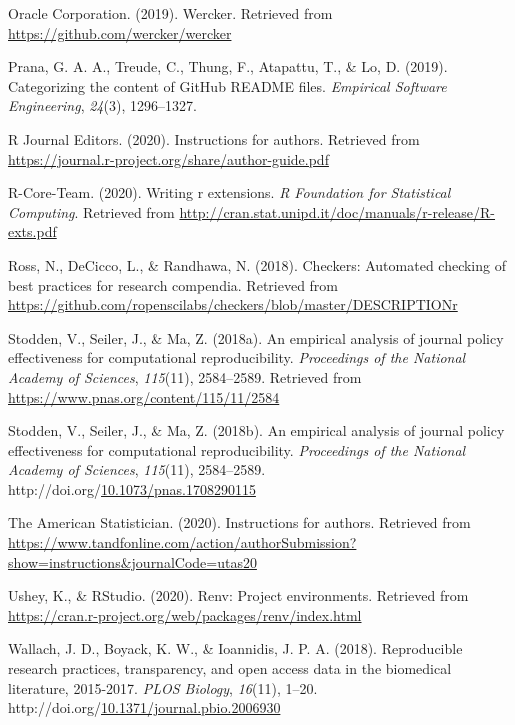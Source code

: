 \documentclass[12pt,twoside]{reedthesis}
\newenvironment{CSLReferences}%
  {}%
  {\par}
\begin{document}
\begin{CSLReferences}{1}{0}
\leavevmode\hypertarget{ref-wercker}{}%
Oracle Corporation. (2019). Wercker. Retrieved from \url{https://github.com/wercker/wercker}

\leavevmode\hypertarget{ref-prana2019categorizing}{}%
Prana, G. A. A., Treude, C., Thung, F., Atapattu, T., \& Lo, D. (2019). Categorizing the content of GitHub README files. \emph{Empirical Software Engineering}, \emph{24}(3), 1296--1327.

\leavevmode\hypertarget{ref-r-journal}{}%
R Journal Editors. (2020). Instructions for authors. Retrieved from \url{https://journal.r-project.org/share/author-guide.pdf}

\leavevmode\hypertarget{ref-coreteam-extensions}{}%
R-Core-Team. (2020). Writing r extensions. \emph{R Foundation for Statistical Computing}. Retrieved from \url{http://cran.stat.unipd.it/doc/manuals/r-release/R-exts.pdf}

\leavevmode\hypertarget{ref-R-checkers}{}%
Ross, N., DeCicco, L., \& Randhawa, N. (2018). Checkers: Automated checking of best practices for research compendia. Retrieved from \url{https://github.com/ropenscilabs/checkers/blob/master/DESCRIPTIONr}

\leavevmode\hypertarget{ref-policy-effectiveness}{}%
Stodden, V., Seiler, J., \& Ma, Z. (2018a). An empirical analysis of journal policy effectiveness for computational reproducibility. \emph{Proceedings of the National Academy of Sciences}, \emph{115}(11), 2584--2589. Retrieved from \url{https://www.pnas.org/content/115/11/2584}

\leavevmode\hypertarget{ref-Stodden2584}{}%
Stodden, V., Seiler, J., \& Ma, Z. (2018b). An empirical analysis of journal policy effectiveness for computational reproducibility. \emph{Proceedings of the National Academy of Sciences}, \emph{115}(11), 2584--2589. http://doi.org/\href{https://doi.org/10.1073/pnas.1708290115}{10.1073/pnas.1708290115}

\leavevmode\hypertarget{ref-ams-guide}{}%
The American Statistician. (2020). Instructions for authors. Retrieved from \url{https://www.tandfonline.com/action/authorSubmission?show=instructions\&journalCode=utas20}

\leavevmode\hypertarget{ref-R-renv}{}%
Ushey, K., \& RStudio. (2020). Renv: Project environments. Retrieved from \url{https://cran.r-project.org/web/packages/renv/index.html}

\leavevmode\hypertarget{ref-plos-biology}{}%
Wallach, J. D., Boyack, K. W., \& Ioannidis, J. P. A. (2018). Reproducible research practices, transparency, and open access data in the biomedical literature, 2015-2017. \emph{PLOS Biology}, \emph{16}(11), 1--20. http://doi.org/\href{https://doi.org/10.1371/journal.pbio.2006930}{10.1371/journal.pbio.2006930}


\end{CSLReferences}
\end{document}
